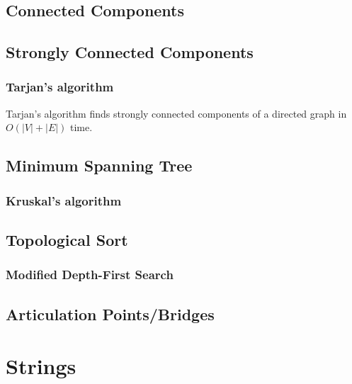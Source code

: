 \documentclass[11pt,a4paper,titlepage]{article}
\begin{document}
		\subsection{Connected Components}
		\subsection{Strongly Connected Components}
			\subsubsection{Tarjan's algorithm}
				Tarjan's algorithm finds strongly connected components of a directed graph in $O(|V|+|E|)$ time.
				
		\subsection{Minimum Spanning Tree}
			\subsubsection{Kruskal's algorithm}
				
		\subsection{Topological Sort}
			\subsubsection{Modified Depth-First Search}
				
		\subsection{Articulation Points/Bridges}

	\section{Strings}
\end{document}
